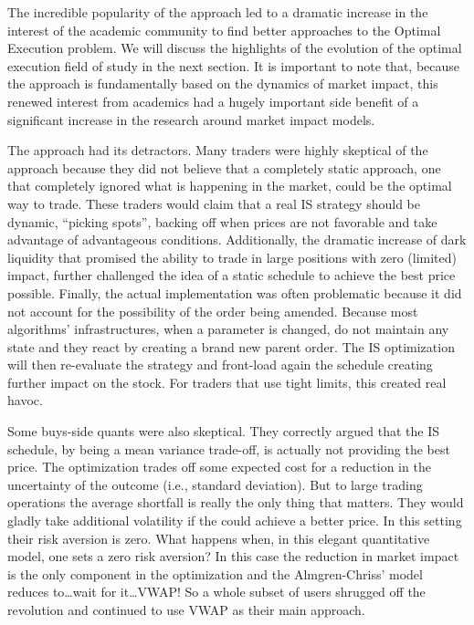 The incredible popularity of the approach led to a dramatic increase in the interest of the academic community to find better approaches to the Optimal Execution problem. We will discuss the highlights of the evolution of the optimal execution field of study in the next section. It is important to note that, because the approach is fundamentally based on the dynamics of market impact, this renewed interest from academics had  a hugely important side benefit of a significant increase in the research around market impact models. \twomedskip


The approach had its detractors. Many traders were highly skeptical of the approach because they did not believe that a completely static approach, one that completely ignored what is happening in the market, could be the optimal way to trade. These traders would claim that a real IS strategy should be dynamic, ``picking spots'', backing off when prices are not favorable and take advantage of advantageous conditions.  Additionally, the dramatic increase of dark liquidity that promised the ability to trade in large positions with zero (limited) impact, further challenged the idea of a static schedule to achieve the best price possible. Finally, the actual implementation was often problematic because it did not account for the possibility of the order being amended. Because most algorithms' infrastructures, when a parameter is changed, do not maintain any state and they react by creating a brand new parent order. The IS optimization will then re-evaluate the strategy and front-load again the schedule creating further impact on the stock. For traders that use tight limits, this created real havoc.

Some buys-side quants were also skeptical. They correctly argued that the IS schedule, by being a mean variance trade-off, is actually not providing the best price. The optimization trades off some expected cost for a reduction in the uncertainty of the outcome (i.e., standard deviation). But to large trading operations the average shortfall is really the only thing that matters. They would gladly take additional volatility if the could achieve a better price. In this setting their risk aversion is zero. What happens when, in this elegant quantitative model, one sets a zero risk aversion? In this case the reduction in market impact is the only component in the optimization and the Almgren-Chriss' model reduces to\dots  wait for it\dots VWAP! So a whole subset of users shrugged off the revolution and continued to use VWAP as their main approach.


